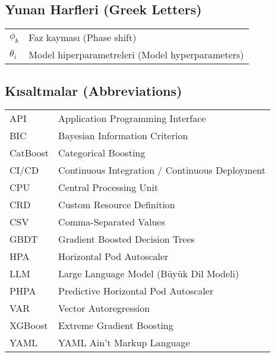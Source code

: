 \subsection{Yunan Harfleri (Greek Letters)}

\begin{tabular}{ll}
$\phi_k$ & Faz kayması (Phase shift) \\
$\theta_i$ & Model hiperparametreleri (Model hyperparameters) \\
\end{tabular}

\subsection{Kısaltmalar (Abbreviations)}

\begin{tabular}{ll}
API & Application Programming Interface \\
BIC & Bayesian Information Criterion \\
CatBoost & Categorical Boosting \\
CI/CD & Continuous Integration / Continuous Deployment \\
CPU & Central Processing Unit \\
CRD & Custom Resource Definition \\
CSV & Comma-Separated Values \\
GBDT & Gradient Boosted Decision Trees \\
HPA & Horizontal Pod Autoscaler \\
LLM & Large Language Model (Büyük Dil Modeli) \\
PHPA & Predictive Horizontal Pod Autoscaler \\
VAR & Vector Autoregression \\
XGBoost & Extreme Gradient Boosting \\
YAML & YAML Ain't Markup Language \\
\end{tabular}
